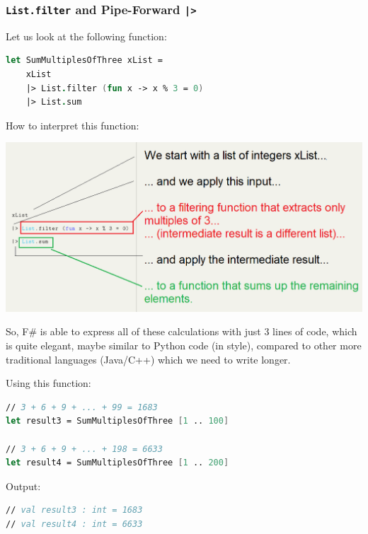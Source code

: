 \documentclass[12pt]{article}
\begin{document}
\pagebreak
\subsubsection*{\texttt{List.filter} and Pipe-Forward \texttt{|>}}
Let us look at the following function:
\begin{lstlisting}[language=FSharp]
let SumMultiplesOfThree xList =
    xList
    |> List.filter (fun x -> x % 3 = 0)
    |> List.sum
\end{lstlisting}
How to interpret this function:
\begin{center}
\includegraphics[width=16cm]{pictures/picture26.png}
\end{center}
So, F\# is able to express all of these calculations with just 3 lines of code, which is quite elegant, maybe similar to Python code (in style), compared to other more traditional languages (Java/C++) which we need to write longer.

Using this function:
\begin{lstlisting}[language=FSharp]
// 3 + 6 + 9 + ... + 99 = 1683
let result3 = SumMultiplesOfThree [1 .. 100]

// 3 + 6 + 9 + ... + 198 = 6633
let result4 = SumMultiplesOfThree [1 .. 200]
\end{lstlisting}
Output:
\begin{lstlisting}[language=FSharp]
// val result3 : int = 1683
// val result4 : int = 6633
\end{lstlisting}

\pagebreak
\end{document}
